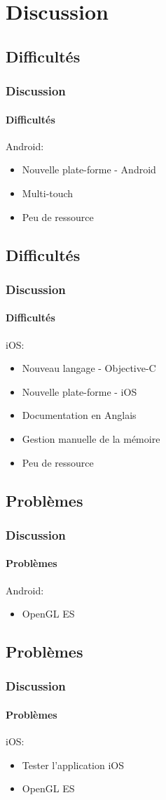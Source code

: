 \section{Discussion}

	\subsection{Difficultés}
		\begin{frame}
			\frametitle{Discussion}
			\framesubtitle{Difficultés}
			Android:
			\begin{itemize}
				\item Nouvelle plate-forme - Android
				\item Multi-touch
				\item Peu de ressource
			\end{itemize}
		\end{frame}


	\subsection{Difficultés}
		\begin{frame}
			\frametitle{Discussion}
			\framesubtitle{Difficultés}
			iOS:
			\begin{itemize}
				\item Nouveau langage - Objective-C
				\item Nouvelle plate-forme - iOS
				\item Documentation en Anglais
				\item Gestion manuelle de la mémoire
				\item Peu de ressource
			\end{itemize}
		\end{frame}
		
		
	\subsection{Problèmes}
		\begin{frame}
			\frametitle{Discussion}
			\framesubtitle{Problèmes}
			Android:
			\begin{itemize}
				\item OpenGL ES
			\end{itemize}
		\end{frame}
		
		
	\subsection{Problèmes}
		\begin{frame}
			\frametitle{Discussion}
			\framesubtitle{Problèmes}
			iOS:
			\begin{itemize}
				\item Tester l'application iOS
				\item OpenGL ES
			\end{itemize}
		\end{frame}
		
